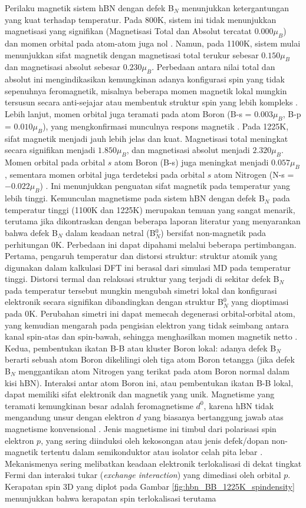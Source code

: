 Perilaku magnetik sistem hBN dengan defek B$_N$ menunjukkan ketergantungan yang kuat terhadap temperatur. Pada 800K, sistem ini tidak menunjukkan magnetisasi yang signifikan (Magnetisasi Total dan Absolut tercatat $0.000 \mu_B$) dan momen orbital pada atom-atom juga nol . Namun, pada 1100K, sistem mulai menunjukkan sifat magnetik dengan magnetisasi total terukur sebesar $0.150 \mu_B$ dan magnetisasi absolut sebesar $0.230 \mu_B$. Perbedaan antara nilai total dan absolut ini mengindikasikan kemungkinan adanya konfigurasi spin yang tidak sepenuhnya feromagnetik, misalnya beberapa momen magnetik lokal mungkin tersusun secara anti-sejajar atau membentuk struktur spin yang lebih kompleks . Lebih lanjut, momen orbital juga teramati pada atom Boron (B-s = $0.003 \mu_B$, B-p = $0.010 \mu_B$), yang mengkonfirmasi munculnya respons magnetik . Pada 1225K, sifat magnetik menjadi jauh lebih jelas dan kuat. Magnetisasi total meningkat secara signifikan menjadi $1.850 \mu_B$, dan magnetisasi absolut menjadi $2.320 \mu_B$. Momen orbital pada orbital $s$ atom Boron (B-s) juga meningkat menjadi $0.057 \mu_B$, sementara momen orbital juga terdeteksi pada orbital $s$ atom Nitrogen (N-s = $-0.022 \mu_B$) . Ini menunjukkan penguatan sifat magnetik pada temperatur yang lebih tinggi. Kemunculan magnetisme pada sistem hBN dengan defek B$_N$ pada temperatur tinggi (1100K dan 1225K) merupakan temuan yang sangat menarik, terutama jika dikontraskan dengan beberapa laporan literatur yang menyarankan bahwa defek B$_N$ dalam keadaan netral (B$_N^0$) bersifat non-magnetik pada perhitungan 0K. Perbedaan ini dapat dipahami melalui beberapa pertimbangan. Pertama, pengaruh temperatur dan distorsi struktur: struktur atomik yang digunakan dalam kalkulasi DFT ini berasal dari simulasi MD pada temperatur tinggi. Distorsi termal dan relaksasi struktur yang terjadi di sekitar defek B$_N$ pada temperatur tersebut mungkin mengubah simetri lokal dan konfigurasi elektronik secara signifikan dibandingkan dengan struktur B$_N^0$ yang dioptimasi pada 0K. Perubahan simetri ini dapat memecah degenerasi orbital-orbital atom, yang kemudian mengarah pada pengisian elektron yang tidak seimbang antara kanal spin-atas dan spin-bawah, sehingga menghasilkan momen magnetik netto . Kedua, pembentukan ikatan B-B atau kluster Boron lokal: adanya defek B$_N$ berarti sebuah atom Boron dikelilingi oleh tiga atom Boron tetangga (jika defek B$_N$ menggantikan atom Nitrogen yang terikat pada atom Boron normal dalam kisi hBN). Interaksi antar atom Boron ini, atau pembentukan ikatan B-B lokal, dapat memiliki sifat elektronik dan magnetik yang unik. Magnetisme yang teramati kemungkinan besar adalah feromagnetisme $d^0$, karena hBN tidak mengandung unsur dengan elektron $d$ yang biasanya bertanggung jawab atas magnetisme konvensional . Jenis magnetisme ini timbul dari polarisasi spin elektron $p$, yang sering diinduksi oleh kekosongan atau jenis defek/dopan non-magnetik tertentu dalam semikonduktor atau isolator celah pita lebar \citep{Zunger2003}. Mekanismenya sering melibatkan keadaan elektronik terlokalisasi di dekat tingkat Fermi dan interaksi tukar (\textit{exchange interaction}) yang dimediasi oleh orbital $p$. Kerapatan spin 3D yang diplot pada Gambar \ref{fig:hbn_BB_1225K_spindensity} menunjukkan bahwa kerapatan spin terlokalisasi terutama 